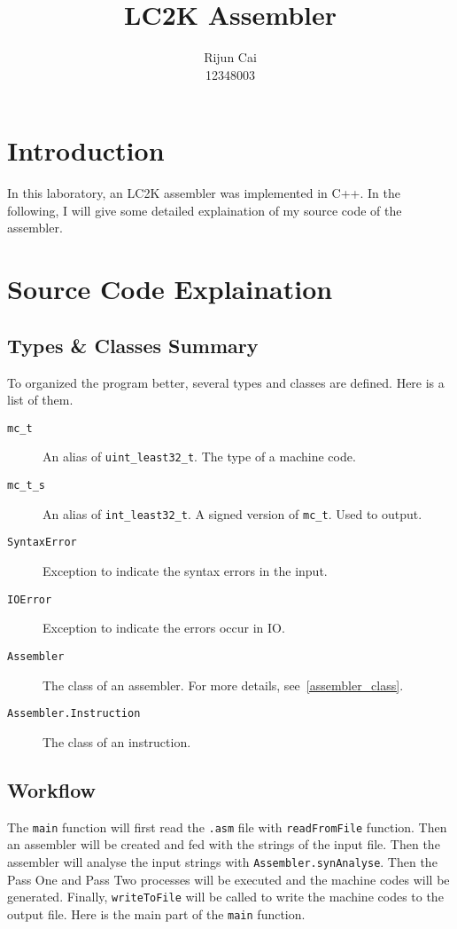 \documentclass[a4paper]{article}
\title{LC2K Assembler}
\author{Rijun Cai\\12348003}
\begin{document}
\maketitle

\section{Introduction}
In this laboratory, an LC2K assembler was implemented in C++. In the following, I will give some detailed explaination
of my source code of the assembler.

\section{Source Code Explaination}
\subsection{Types \& Classes Summary}
To organized the program better, several types and classes are defined. Here is a list of them.

\begin{description}
    \item[\texttt{mc\_t}] An alias of \verb|uint_least32_t|. The type of a machine code.
    \item[\texttt{mc\_t\_s}] An alias of \verb|int_least32_t|. A signed version of \verb|mc_t|. Used to output.
    \item[\texttt{SyntaxError}] Exception to indicate the syntax errors in the input.
    \item[\texttt{IOError}] Exception to indicate the errors occur in IO\@.
    \item[\texttt{Assembler}] The class of an assembler. For more details, see~\ref{assembler_class}.
    \item[\texttt{Assembler.Instruction}] The class of an instruction.
\end{description}

\subsection{Workflow}
The \verb|main| function will first read the \verb|.asm| file with \verb|readFromFile| function.
Then an assembler will be created and fed with the strings of the input file. Then the assembler will analyse
the input strings with \verb|Assembler.synAnalyse|. Then the Pass One and Pass Two processes will be executed and
the machine codes will be generated. Finally, \verb|writeToFile| will be called to write the machine codes to the
output file. Here is the main part of the \verb|main| function.
\end{document}
